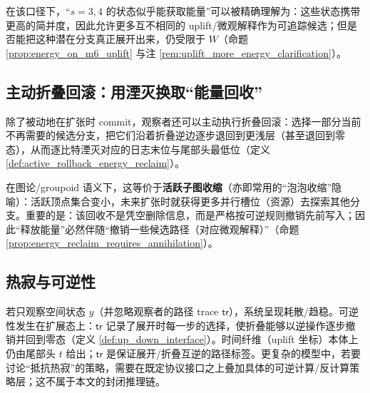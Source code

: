 在该口径下，“\(s=3,4\) 的状态似乎能获取能量”可以被精确理解为：这些状态携带更高的简并度，因此允许更多互不相同的 uplift/微观解释作为可追踪候选；但是否能把这种潜在分支真正展开出来，仍受限于 \(W\)（命题 \ref{prop:energy_on_m6_uplift} 与注 \ref{rem:uplift_more_energy_clarification}）。

\subsection{主动折叠回滚：用湮灭换取“能量回收”}
除了被动地在扩张时 commit，观察者还可以主动执行折叠回滚：选择一部分当前不再需要的候选分支，把它们沿着折叠逆边逐步退回到更浅层（甚至退回到零态），从而逐比特湮灭对应的日志末位与尾部头最低位（定义 \ref{def:active_rollback_energy_reclaim}）。

在图论/groupoid 语义下，这等价于\textbf{活跃子图收缩}（亦即常用的“泡泡收缩”隐喻）：活跃顶点集合变小，未来扩张时就获得更多并行槽位（资源）去探索其他分支。重要的是：该回收不是凭空删除信息，而是严格按可逆规则撤销先前写入；因此“释放能量”必然伴随“撤销一些候选路径（对应微观解释）”（命题 \ref{prop:energy_reclaim_requires_annihilation}）。

\subsection{热寂与可逆性}
若只观察空间状态 \(y\)（并忽略观察者的路径 trace \(\mathsf{tr}\)），系统呈现耗散/趋稳。可逆性发生在扩展态上：\(\mathsf{tr}\) 记录了展开时每一步的选择，使折叠能够以逆操作逐步撤销并回到零态（定义 \ref{def:up_down_interface}）。时间纤维（uplift 坐标）本体上仍由尾部头 \(t\) 给出；\(\mathsf{tr}\) 是保证展开/折叠互逆的路径标签。更复杂的模型中，若要讨论“抵抗热寂”的策略，需要在既定协议接口之上叠加具体的可逆计算/反计算策略层；这不属于本文的封闭推理链。

